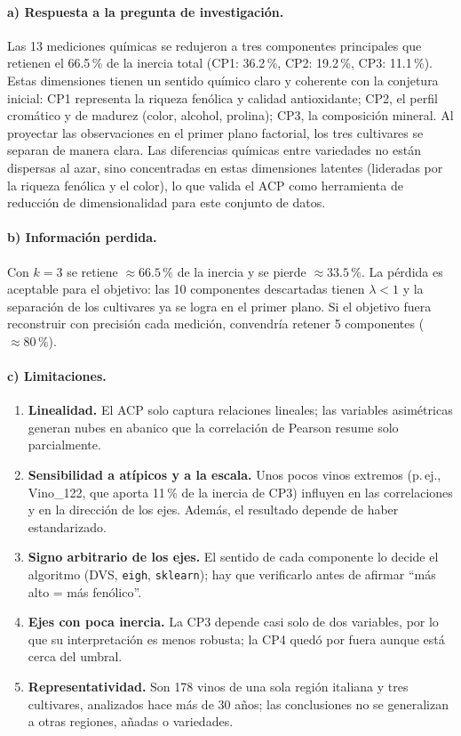 \documentclass[11pt,a4paper]{article}
\begin{document}
\paragraph{a) Respuesta a la pregunta de investigación.} Las 13 mediciones químicas se redujeron a tres componentes principales que retienen el 66.5\,\% de la inercia total (CP1: 36.2\,\%, CP2: 19.2\,\%, CP3: 11.1\,\%). Estas dimensiones tienen un sentido químico claro y coherente con la conjetura inicial: CP1 representa la riqueza fenólica y calidad antioxidante; CP2, el perfil cromático y de madurez (color, alcohol, prolina); CP3, la composición mineral. Al proyectar las observaciones en el primer plano factorial, los tres cultivares se separan de manera clara. Las diferencias químicas entre variedades no están dispersas al azar, sino concentradas en estas dimensiones latentes (lideradas por la riqueza fenólica y el color), lo que valida el ACP como herramienta de reducción de dimensionalidad para este conjunto de datos.

\paragraph{b) Información perdida.} Con $k = 3$ se retiene $\approx 66.5\,\%$ de la inercia y se pierde $\approx \mathbf{33.5\,\%}$. La pérdida es aceptable para el objetivo: las 10 componentes descartadas tienen $\lambda < 1$ y la separación de los cultivares ya se logra en el primer plano. Si el objetivo fuera reconstruir con precisión cada medición, convendría retener 5 componentes ($\approx 80\,\%$).

\paragraph{c) Limitaciones.}
\begin{enumerate}[leftmargin=*]
  \item \textbf{Linealidad.} El ACP solo captura relaciones lineales; las variables asimétricas generan nubes en abanico que la correlación de Pearson resume solo parcialmente.
  \item \textbf{Sensibilidad a atípicos y a la escala.} Unos pocos vinos extremos (p.\,ej., Vino\_122, que aporta 11\,\% de la inercia de CP3) influyen en las correlaciones y en la dirección de los ejes. Además, el resultado depende de haber estandarizado.
  \item \textbf{Signo arbitrario de los ejes.} El sentido de cada componente lo decide el algoritmo (DVS, \texttt{eigh}, \texttt{sklearn}); hay que verificarlo antes de afirmar ``más alto = más fenólico''.
  \item \textbf{Ejes con poca inercia.} La CP3 depende casi solo de dos variables, por lo que su interpretación es menos robusta; la CP4 quedó por fuera aunque está cerca del umbral.
  \item \textbf{Representatividad.} Son 178 vinos de una sola región italiana y tres cultivares, analizados hace más de 30 años; las conclusiones no se generalizan a otras regiones, añadas o variedades.
\end{enumerate}
\end{document}
